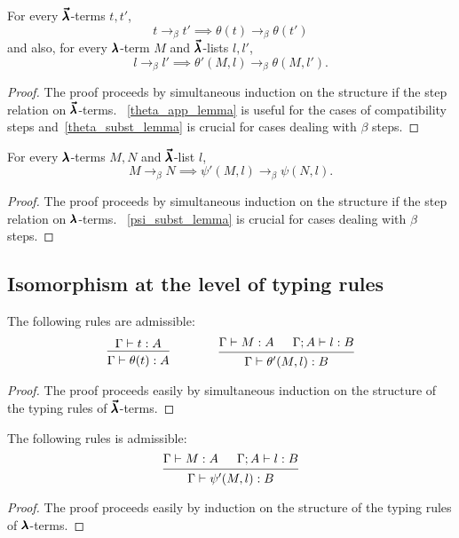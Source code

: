 \begin{theorem}
  \label{theorem9}
  For every $\pmb{\vec \lambda}$-terms $t, t'$,
  \[ t \to_{\beta} t' \implies \theta(t) \to_{\beta} \theta(t') \]
  and also, for every $\pmb{\lambda}$-term $M$ and $\pmb{\vec \lambda}$-lists $l, l'$,
  \[ l \to_{\beta} l' \implies \theta'(M, l) \to_{\beta} \theta(M, l'). \]
\end{theorem}
\begin{proof}
  The proof proceeds by simultaneous induction on the structure if the step relation on $\pmb{\vec \lambda}$-terms.
  ~\cref{theta_app_lemma} is useful for the cases of compatibility steps and~\cref{theta_subst_lemma} is crucial for cases dealing with $\beta$ steps.
\end{proof}


\begin{theorem}
  \label{theorem10}
  For every $\pmb{\lambda}$-terms $M, N$ and $\pmb{\vec \lambda}$-list $l$,
  \[ M \to_{\beta} N \implies \psi'(M, l) \to_{\beta} \psi(N, l). \]
\end{theorem}
\begin{proof}
  The proof proceeds by simultaneous induction on the structure if the step relation on $\pmb{\lambda}$-terms.
  ~\cref{psi_subst_lemma} is crucial for cases dealing with $\beta$ steps.
\end{proof}

\subsection{Isomorphism at the level of typing rules}

\begin{theorem}
  \label{theorem11}
  The following rules are admissible:
  \[ \begin{prooftree}
      \hypo{ \Gamma \vdash t : A }
      \infer1{ \Gamma \vdash \theta(t) : A } 
    \end{prooftree}
    \qquad \qquad
    \begin{prooftree}
      \hypo{ \Gamma \vdash M : A }
      \hypo{ \Gamma ; A \vdash l : B }
      \infer2{ \Gamma \vdash \theta'(M, l) : B }.
    \end{prooftree} \]
\end{theorem}
\begin{proof}
  The proof proceeds easily by simultaneous induction on the structure of the typing rules of $\pmb{\vec \lambda}$-terms.
\end{proof}

\begin{theorem}
  \label{theorem12}
  The following rules is admissible:
  \[ \begin{prooftree}
      \hypo{ \Gamma \vdash M : A }
      \hypo{ \Gamma ; A \vdash l : B }
      \infer2{ \Gamma \vdash \psi'(M, l) : B }.
    \end{prooftree} \]
\end{theorem}
\begin{proof}
  The proof proceeds easily by induction on the structure of the typing rules of $\pmb{\lambda}$-terms.
\end{proof}

